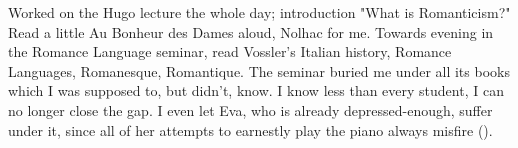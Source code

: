 
Worked on the Hugo lecture the whole day; introduction "What is Romanticism?" Read a little Au Bonheur des Dames aloud, Nolhac for me. Towards evening in the Romance Language seminar, read Vossler's Italian history,  Romance Languages, Romanesque, Romantique. The seminar buried me under all its books which I was supposed to, but didn't, know. I know less than every student, I can no longer close the gap. I even let Eva, who is already depressed-enough, suffer under it, since all of her attempts to earnestly play the piano always misfire ().

\missing
